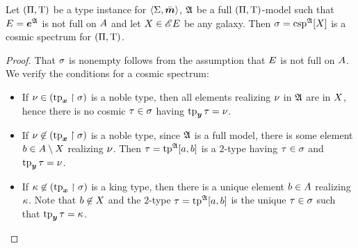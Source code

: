 \begin{remark}
Let $(\Pi,\mathrm{T})$ be a type instance for $\left\langle \mathrm{\Sigma},\bar{\bm{m}} \right\rangle$, $\mathfrak{A}$ be a full
$(\Pi,\mathrm{T})$-model such that $E = \bm{e}^{\mathfrak{A}}$ is not full on $A$
and let $X \in {\mathscr{E}E}$ be any galaxy.
Then $\sigma = \operatorname{csp}^{\mathfrak{A}}[X]$ is a cosmic spectrum for $(\Pi,\mathrm{T})$.
\end{remark}
\begin{proof}
That $\sigma$ is nonempty follows from the assumption that $E$ is not full on
$A$. We verify the conditions for a cosmic spectrum:
\begin{itemize}
  \item[\refcspcondIIp] If $\nu \in (\operatorname{tp}_{\bm{x}}\restriction\sigma)$ is a noble type, then all
  elements realizing $\nu$ in $\mathfrak{A}$ are in $X$, hence there is no cosmic
  $\tau \in \sigma$ having $\operatorname{tp}_{\bm{y}}\tau = \nu$.
  \item If $\nu \not\in (\operatorname{tp}_{\bm{x}}\restriction\sigma)$ is a noble type,
  since $\mathfrak{A}$ is a full model, there is some element $b \in A \setminus
  X$ realizing $\nu$. Then $\tau = \operatorname{tp}^{\mathfrak{A}}[a,b]$ is a $2$-type
  having $\tau \in \sigma$ and $\operatorname{tp}_{\bm{y}}\tau = \nu$.
  \item If $\kappa \not\in (\operatorname{tp}_{\bm{x}}\restriction\sigma)$ is a king type, then there is
  a unique element $b \in A$ realizing $\kappa$.
  Note that $b \not\in X$ and the $2$-type
  $\tau = \operatorname{tp}^{\mathfrak{A}}[a,b]$ is the unique $\tau \in \sigma$ such that
  $\operatorname{tp}_{\bm{y}}\tau = \kappa$.
\end{itemize}
\end{proof}

